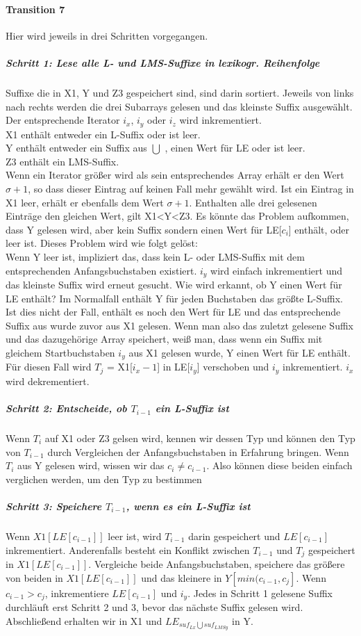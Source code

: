 \paragraph{Transition 7}
Hier wird jeweils in drei Schritten vorgegangen.
\subparagraph{Schritt 1: Lese alle L- und LMS-Suffixe in lexikogr. Reihenfolge}
Suffixe die in X1, Y und Z3 gespeichert sind, sind darin sortiert. Jeweils von links nach rechts werden die drei Subarrays gelesen und das kleinste Suffix ausgewählt. Der entsprechende Iterator $i_{x}$, $i_{y}$ oder $i_{z}$ wird inkrementiert.\\
X1 enthält entweder ein L-Suffix oder ist leer.\\
Y enthält entweder ein Suffix aus \lx $\bigcup$ \lmsy, einen Wert für LE oder ist leer.\\
Z3 enthält ein LMS-Suffix.\\
Wenn ein Iterator größer wird als sein entsprechendes Array erhält er den Wert $\sigma + 1$, so dass dieser Eintrag auf keinen Fall mehr gewählt wird. Ist ein Eintrag in X1 leer, erhält er ebenfalls dem Wert $\sigma + 1$. Enthalten alle drei gelesenen Einträge den gleichen Wert, gilt X1<Y<Z3. Es könnte das Problem aufkommen, dass Y gelesen wird, aber kein Suffix sondern einen Wert für LE[$c_{i}$] enthält, oder leer ist. Dieses Problem wird wie folgt gelöst:\\
Wenn Y leer ist, impliziert das, dass kein L- oder LMS-Suffix mit dem entsprechenden Anfangsbuchstaben existiert. $i_{y}$ wird einfach inkrementiert und das kleinste Suffix wird erneut gesucht. Wie wird erkannt, ob Y einen Wert für LE enthält? Im Normalfall enthält Y für jeden Buchstaben das größte L-Suffix. Ist dies nicht der Fall, enthält es noch den Wert für LE und das entsprechende Suffix aus \lx wurde zuvor aus X1 gelesen. Wenn man also das zuletzt gelesene Suffix und das dazugehörige Array speichert, weiß man, dass wenn ein Suffix mit gleichem Startbuchstaben $i_{y}$ aus X1 gelesen wurde, Y einen Wert für LE enthält. Für diesen Fall wird $T_{j}$ = X1[$i_{x}-1$] in LE[$i_{y}$] verschoben und $i_{y}$ inkrementiert. $i_{x}$ wird dekrementiert.
\subparagraph{Schritt 2: Entscheide, ob $T_{i-1}$ ein L-Suffix ist}
Wenn $T_{i}$ auf X1 oder Z3 gelsen wird, kennen wir dessen Typ und können den Typ von $T_{i-1}$ durch Vergleichen der Anfangsbuchstaben in Erfahrung bringen. Wenn $T_{i}$ aus Y gelesen wird, wissen wir das $c_{i}\neq c_{i-1}$. Also können diese beiden einfach verglichen werden, um den Typ zu bestimmen
\subparagraph{Schritt 3: Speichere $T_{i-1}$, wenn es ein L-Suffix ist}
Wenn $X1[LE[c_{i-1}]]$ leer ist, wird $T_{i-1}$ darin gespeichert und $LE[c_{i-1}]$ inkrementiert. Anderenfalls besteht ein Konflikt zwischen $T_{i-1}$ und $T_{j}$ gespeichert in $X1[LE[c_{i-1}]]$. Vergleiche beide Anfangsbuchstaben, speichere das größere von beiden in $X1[LE[c_{i-1}]]$ und das kleinere in $Y[min(c_{i-1},c_{j}]$. Wenn $c_{i-1}>c_{j}$, inkrementiere $LE[c_{i-1}]$ und $i_{y}$.
\bigskip
Jedes in Schritt 1 gelesene Suffix durchläuft erst Schritt 2 und 3, bevor das nächste Suffix gelesen wird. Abschließend erhalten wir \SAlxnot in X1 und $LE_{suf_{Lx}\bigcup suf_{LMSy}}$ in Y.
